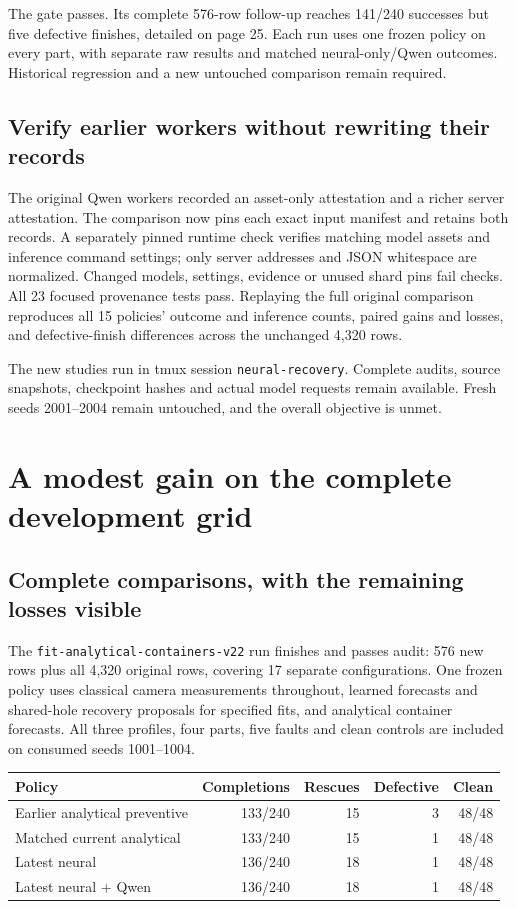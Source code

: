 \documentclass[10pt,letterpaper]{article}
\begin{document}
The gate passes. Its complete 576-row follow-up reaches 141/240 successes but
five defective finishes, detailed on page 25. Each run uses one frozen policy on
every part, with separate raw results and matched neural-only/Qwen outcomes.
Historical regression and a new untouched comparison remain required.

\subsection*{Verify earlier workers without rewriting their records}
The original Qwen workers recorded an asset-only attestation and a richer server
attestation. The comparison now pins each exact input manifest and retains both
records. A separately pinned runtime check verifies matching model assets and
inference command settings; only server addresses and JSON whitespace are
normalized. Changed models, settings, evidence or unused shard pins fail checks.
All 23 focused provenance tests pass. Replaying the full original comparison
reproduces all 15 policies' outcome and inference counts, paired gains and losses,
and defective-finish differences across the unchanged 4,320 rows.

The new studies run in tmux session \texttt{neural-recovery}. Complete audits,
source snapshots, checkpoint hashes and actual model requests remain available.
Fresh seeds 2001--2004 remain untouched, and the overall objective is unmet.

\clearpage
\section{A modest gain on the complete development grid}

\subsection*{Complete comparisons, with the remaining losses visible}
The \texttt{fit-analytical-containers-v22} run finishes and passes audit: 576 new
rows plus all 4,320 original rows, covering 17 separate configurations. One
frozen policy uses classical camera measurements throughout, learned forecasts
and shared-hole recovery proposals for specified fits, and analytical container
forecasts. All three profiles, four parts, five faults and clean controls are
included on consumed seeds 1001--1004.

\begin{center}
\begin{tabular}{@{}lrrrr@{}}
\toprule
Policy & Completions & Rescues & Defective & Clean \\
\midrule
Earlier analytical preventive & 133/240 & 15 & 3 & 48/48 \\
Matched current analytical & 133/240 & 15 & 1 & 48/48 \\
Latest neural & 136/240 & 18 & 1 & 48/48 \\
Latest neural + Qwen & 136/240 & 18 & 1 & 48/48 \\
\bottomrule
\end{tabular}
\end{center}
\end{document}

